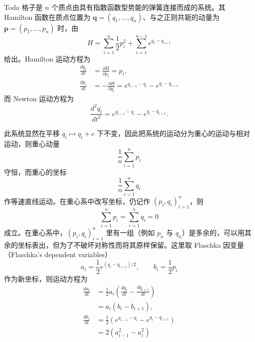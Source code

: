 Toda 格子是 $n$ 个质点由具有指数函数型势能的弹簧连接而成的系统。其 Hamilton 函数在质点位置为 $\bm{q}=(q_1,\dots,q_n)$、与之正则共轭的动量为 $\bm{p}=(p_1,\dots,p_n)$ 时，由
\begin{equation}
  H=\sum_{i=1}^{n}\frac12 p_i^2+\sum_{i=1}^{n-1}e^{q_i-q_{i+1}}
  \tag{6.3.1}
\end{equation}
给出。Hamilton 运动方程为
\begin{align}
  \frac{dq_i}{dt}&=\frac{\partial H}{\partial p_i}=p_i, \tag{6.3.2}\\
  \frac{dp_i}{dt}&=-\frac{\partial H}{\partial q_i}=e^{q_{i-1}-q_i}-e^{q_i-q_{i+1}} \tag{6.3.3}
\end{align}
而 Newton 运动方程为
\begin{equation}
  \frac{d^2q_i}{dt^2}=e^{q_{i-1}-q_i}-e^{q_i-q_{i+1}}.
  \tag{6.3.4}
\end{equation}


此系统显然在平移 $q_i\mapsto q_i+c$ 下不变，因此把系统的运动分为重心的运动与相对运动，则重心动量
\begin{equation}
  \frac1n\sum_{i=1}^{n}p_i
  \tag{6.3.5}
\end{equation}
守恒，而重心的坐标
\begin{equation}
  \frac1n\sum_{i=1}^{n}q_i
  \tag{6.3.6}
\end{equation}
作等速直线运动。在重心系中改写坐标，仍记作 $(p_i,q_i)_{i=1}^n$，则
\begin{equation}
  \sum_{i=1}^{n}p_i=\sum_{i=1}^{n}q_i=0
  \tag{6.3.7}
\end{equation}
成立。在重心系中，$(p_i,q_i)_{i=1}^n$ 里有一组（例如 $p_n$ 与 $q_n$）是多余的，可以用其余的坐标表出，但为了不破坏对称性而将其原样保留。这里取 Flaschka 因变量（Flaschka's dependent variables）
\begin{equation}
  a_i=\frac12 e^{(q_i-q_{i+1})/2},\qquad b_i=\frac12 p_i
  \tag{6.3.8}
\end{equation}
作为新坐标，则运动方程为
\begin{align}
  \frac{da_i}{dt}&=\frac12 a_i\left(\frac{dq_i}{dt}-\frac{dq_{i+1}}{dt}\right) \tag{6.3.9}\\
  &=a_i(b_i-b_{i+1}), \tag{6.3.10}\\
  \frac{db_i}{dt}&=\frac12\left(e^{q_{i-1}-q_i}-e^{q_i-q_{i+1}}\right) \tag{6.3.11}\\
  &=2\left(a_{i-1}^2-a_i^2\right) \tag{6.3.12}
\end{align}

